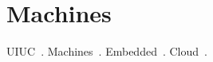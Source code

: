 \section{Machines}
\label{sec:machines}

UIUC~\cite{sep+09}.
Machines~\cite{admb14,ibs12,kl10,kdh+06,tl10,whk+13}.
Embedded~\cite{rpm+15}.
Cloud~\cite{pcc14}.
